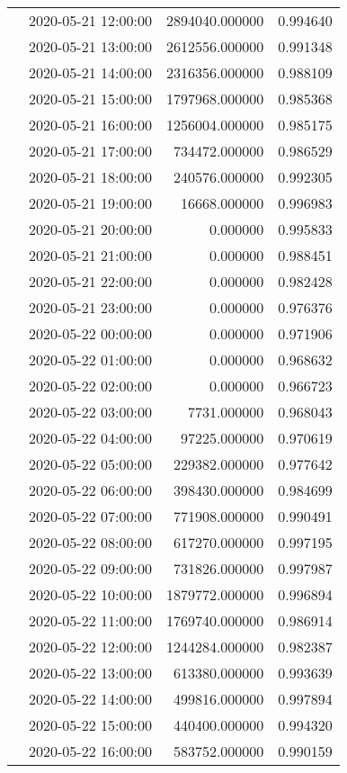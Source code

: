 \begin{tabular}{llrr}
 & 2020-05-21 12:00:00 & 2894040.000000 & 0.994640 \\
 & 2020-05-21 13:00:00 & 2612556.000000 & 0.991348 \\
 & 2020-05-21 14:00:00 & 2316356.000000 & 0.988109 \\
 & 2020-05-21 15:00:00 & 1797968.000000 & 0.985368 \\
 & 2020-05-21 16:00:00 & 1256004.000000 & 0.985175 \\
 & 2020-05-21 17:00:00 & 734472.000000 & 0.986529 \\
 & 2020-05-21 18:00:00 & 240576.000000 & 0.992305 \\
 & 2020-05-21 19:00:00 & 16668.000000 & 0.996983 \\
 & 2020-05-21 20:00:00 & 0.000000 & 0.995833 \\
 & 2020-05-21 21:00:00 & 0.000000 & 0.988451 \\
 & 2020-05-21 22:00:00 & 0.000000 & 0.982428 \\
 & 2020-05-21 23:00:00 & 0.000000 & 0.976376 \\
 & 2020-05-22 00:00:00 & 0.000000 & 0.971906 \\
 & 2020-05-22 01:00:00 & 0.000000 & 0.968632 \\
 & 2020-05-22 02:00:00 & 0.000000 & 0.966723 \\
 & 2020-05-22 03:00:00 & 7731.000000 & 0.968043 \\
 & 2020-05-22 04:00:00 & 97225.000000 & 0.970619 \\
 & 2020-05-22 05:00:00 & 229382.000000 & 0.977642 \\
 & 2020-05-22 06:00:00 & 398430.000000 & 0.984699 \\
 & 2020-05-22 07:00:00 & 771908.000000 & 0.990491 \\
 & 2020-05-22 08:00:00 & 617270.000000 & 0.997195 \\
 & 2020-05-22 09:00:00 & 731826.000000 & 0.997987 \\
 & 2020-05-22 10:00:00 & 1879772.000000 & 0.996894 \\
 & 2020-05-22 11:00:00 & 1769740.000000 & 0.986914 \\
 & 2020-05-22 12:00:00 & 1244284.000000 & 0.982387 \\
 & 2020-05-22 13:00:00 & 613380.000000 & 0.993639 \\
 & 2020-05-22 14:00:00 & 499816.000000 & 0.997894 \\
 & 2020-05-22 15:00:00 & 440400.000000 & 0.994320 \\
 & 2020-05-22 16:00:00 & 583752.000000 & 0.990159 \\

\end{tabular}

